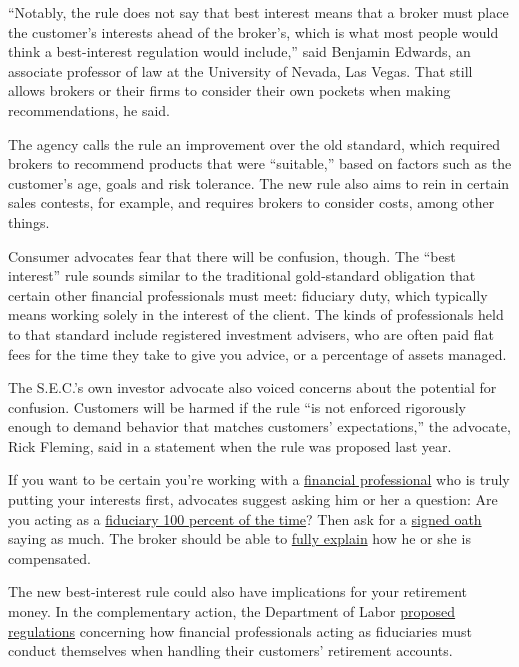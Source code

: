 ``Notably, the rule does not say that best interest means that a broker
must place the customer's interests ahead of the broker's, which is what
most people would think a best-interest regulation would include,'' said
Benjamin Edwards, an associate professor of law at the University of
Nevada, Las Vegas. That still allows brokers or their firms to consider
their own pockets when making recommendations, he said.

The agency calls the rule an improvement over the old standard, which
required brokers to recommend products that were ``suitable,'' based on
factors such as the customer's age, goals and risk tolerance. The new
rule also aims to rein in certain sales contests, for example, and
requires brokers to consider costs, among other things.

Consumer advocates fear that there will be confusion, though. The ``best
interest'' rule sounds similar to the traditional gold-standard
obligation that certain other financial professionals must meet:
fiduciary duty, which typically means working solely in the interest of
the client. The kinds of professionals held to that standard include
registered investment advisers, who are often paid flat fees for the
time they take to give you advice, or a percentage of assets managed.

The S.E.C.'s own investor advocate also voiced concerns about the
potential for confusion. Customers will be harmed if the rule ``is not
enforced rigorously enough to demand behavior that matches customers'
expectations,'' the advocate, Rick Fleming, said in a statement when the
rule was proposed last year.

If you want to be certain you're working with a
\href{https://www.nytimes3xbfgragh.onion/2020/02/10/smarter-living/the-young-persons-guide-to-investing.html}{financial
professional} who is truly putting your interests first, advocates
suggest asking him or her a question: Are you acting as a
\href{https://twitter.com/FiduciaryPath/status/1136357717776457729}{fiduciary
100 percent of the time}? Then ask for a
\href{http://www.thefiduciarystandard.org/wp-content/uploads/2015/02/fiduciaryoath_individual.pdf}{signed
oath} saying as much. The broker should be able to
\href{https://www.nytimes3xbfgragh.onion/2017/02/10/your-money/the-21-questions-youre-going-to-need-to-ask-about-investment-fees.html}{fully
explain} how he or she is compensated.

The new best-interest rule could also have implications for your
retirement money. In the complementary action, the Department of Labor
\href{https://www.dol.gov/agencies/ebsa/about-ebsa/our-activities/resource-center/fact-sheets/improving-investment-advice-for-workers-and-retirees}{proposed
regulations} concerning how financial professionals acting as
fiduciaries must conduct themselves when handling their customers'
retirement accounts.


